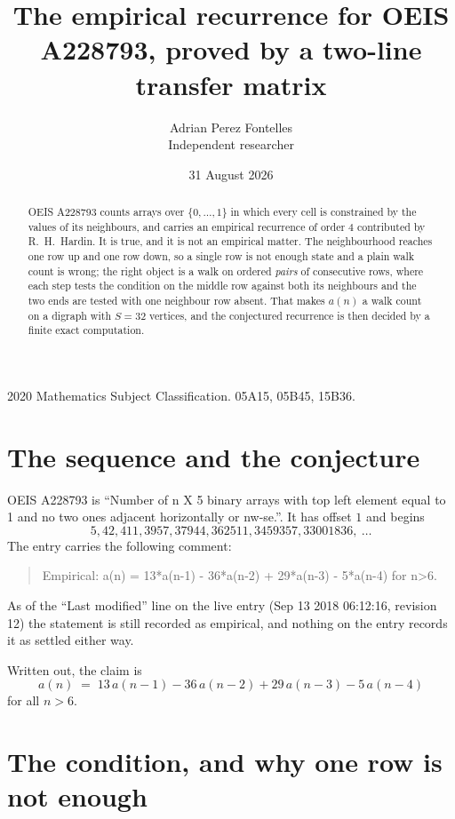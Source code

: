 \documentclass[11pt,a4paper]{article}
\title{The empirical recurrence for OEIS A228793, proved by a two-line transfer matrix}
\author{Adrian Perez Fontelles\\ \small Independent researcher}
\date{31 August 2026}
\theoremstyle{plain}
\theoremstyle{definition}
\begin{document}
\maketitle

\begin{abstract}
OEIS A228793 counts arrays over $\{0,\dots,1\}$ in which every cell is constrained by the
values of its neighbours, and carries an empirical recurrence of order $4$ contributed
by R.~H.~Hardin. It is true, and it is not an empirical matter. The neighbourhood reaches one
row up and one row down, so a single row is not enough state and a plain walk count
is wrong; the right object is a walk on ordered \emph{pairs} of consecutive rows, where
each step tests the condition on the middle row against both its neighbours and the two
ends are tested with one neighbour row absent. That makes $a(n)$ a walk count on a digraph
with $S=32$ vertices, and the conjectured recurrence is then decided by a finite exact
computation.
\end{abstract}

\noindent\small 2020 Mathematics Subject Classification. 05A15, 05B45, 15B36.\normalsize

\section{The sequence and the conjecture}

OEIS A228793 is ``Number of n X 5 binary arrays with top left element equal to 1 and no two ones adjacent horizontally or nw-se.''. It has offset $1$ and begins
\[
5, 42, 411, 3957, 37944, 362511, 3459357, 33001836,\ \dots
\]
The entry carries the following comment:
\begin{quote}\small
Empirical: a(n) = 13*a(n-1) - 36*a(n-2) + 29*a(n-3) - 5*a(n-4) for n>6.
\end{quote}
As of the ``Last modified'' line on the live entry (Sep 13 2018 06:12:16, revision 12) the statement is
still recorded as empirical, and nothing on the entry records it as settled either way.

Written out, the claim is
\begin{equation}\label{eq:conj}
a(n)\;=\;13\,a(n-1) - 36\,a(n-2) + 29\,a(n-3) - 5\,a(n-4)
\end{equation}
for all $n>6$.

\section{The condition, and why one row is not enough}
\end{document}
